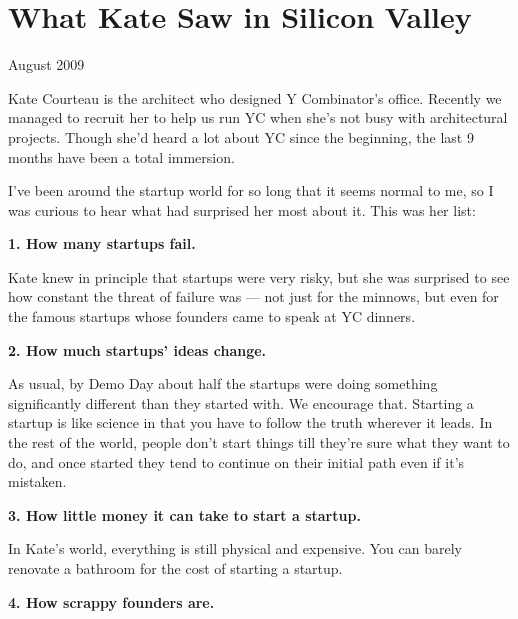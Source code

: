 \chapter{What Kate Saw in Silicon Valley}


            
              
                

August 2009

Kate Courteau is the architect who
                  designed Y Combinator's office. Recently we managed to recruit
                  her to help us run YC when she's not busy with architectural
                  projects. Though she'd heard a lot about YC since the
                  beginning, the last 9 months have been a total immersion.

I've
                  been around the startup world for so long that it seems normal
                  to me, so I was curious to hear what had surprised her most
                  about it. This was her list:



\textbf{1. How many startups fail.}

Kate knew in principle that startups were very
                  risky, but she was surprised to see how constant the threat of
                  failure was --- not just for the minnows, but even for the
                  famous startups whose founders came to speak at YC dinners.


                  \textbf{2. How much startups' ideas change.}

As
                  usual, by Demo Day about half the startups were doing
                  something significantly different than they started with. We
                  encourage that. Starting a startup is like science in that you
                  have to follow the truth wherever it leads. In the rest of the
                  world, people don't start things till they're sure what they
                  want to do, and once started they tend to continue on their
                  initial path even if it's mistaken.


                  \textbf{3. How little money it can take to start a startup.}

In Kate's world, everything is still physical and
                  expensive. You can barely renovate a bathroom for the cost of
                  starting a startup.


                  \textbf{4. How scrappy founders are.}


